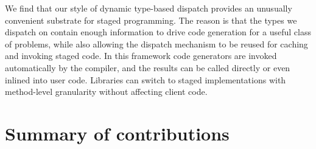 We find that our style of dynamic type-based dispatch provides
an unusually convenient substrate for staged programming.
The reason is that the types we dispatch on contain enough
information to drive code generation for a useful class of problems,
while also allowing
the dispatch mechanism to be reused for caching and invoking staged code.
In this framework code generators are invoked automatically by
the compiler, and the results can be called directly or even inlined
into user code.
Libraries can switch to staged implementations with method-level granularity
without affecting client code.




\section{Summary of contributions}

\iffalse
We began with a belief that we could design a technical computing language
sufficiently novel and powerful that it could gain popularity
in real applications.
The key idea was that language level abstractions could bring ease of use,
performance, and wider applicability to technical computation.
It is far from trivial to analyze and design this right set of abstractions
This thesis contributes a deep analysis of our findings.  

At the very core, the novel idea in this
thesis is the very notion that technical computing is amenable to deep language
analysis.
As simple as this may sound, many in the technical computing world did not
understand how a computer science approach to technical computing could be
useful to them.
Our personal experience describing the research plan to
the computer science world might be
characterized by the view that this space consists of library
functions such as FFTs and matmuls and would not be as interesting
to analyze.
Despite the early discouraging viewpoints, five years later,
the power of language analysis is manifesting itself
theoretically, opening new research directions, and practically in that Julia
has worldwide name recognition and worldwide adaption.
\fi


